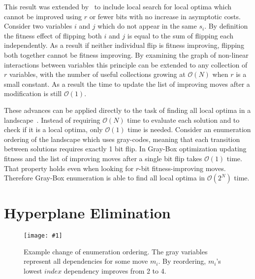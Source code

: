 \documentclass[runningheads,a4paper]{llncs}
\newcommand{\includegraphicsfit}[1]
{\texttt{[image: \#1]}}
\newcommand{\BigO}[1]{$\mathcal{O}{(#1)}$}
\begin{document}
This result was extended by~\cite{chicano:2014:ball} to include local search for local
optima which cannot be improved using $r$ or fewer bits with no increase in asymptotic costs.
Consider two variables $i$ and $j$ which do not appear in the same $s_i$.
By definition the fitness effect of flipping both $i$ and $j$ is equal to the sum
of flipping each independently. As a result if neither individual flip is fitness improving,
flipping both together cannot be fitness improving. By examining the graph of non-linear
interactions between variables this principle can be extended to any collection of $r$
variables, with the number of useful collections growing at \BigO{N} when $r$ is a small constant.
As a result the time to update the list of improving moves after a modification is still \BigO{1}.

These advances can be applied directly to the task of finding all local optima in a
landscape~\cite{ochoa:2015:crossovernetworks}.
Instead of requiring \BigO{N} time to evaluate each solution and to check if it
is a local optima, only \BigO{1} time is needed. Consider an enumeration ordering of the landscape
which uses gray-codes, meaning that each transition between solutions requires exactly 1 bit flip.
In Gray-Box optimization updating fitness and the list of improving moves after a single bit flip
takes \BigO{1} time. That property holds even when looking for $r$-bit fitness-improving moves.
Therefore Gray-Box enumeration is able to find all local optima in \BigO{2^N} time.

\section{Hyperplane Elimination}
\begin{figure*}
  \centering
  \includegraphicsfit{Enumerate}
  \caption{Example change of enumeration ordering. The gray variables represent all dependencies
           for some move $m_i$. By reordering, $m_i$'s lowest $index$ dependency improves from 2 to 4.}
  \label{fig-enumerate}
\end{figure*}
\end{document}
